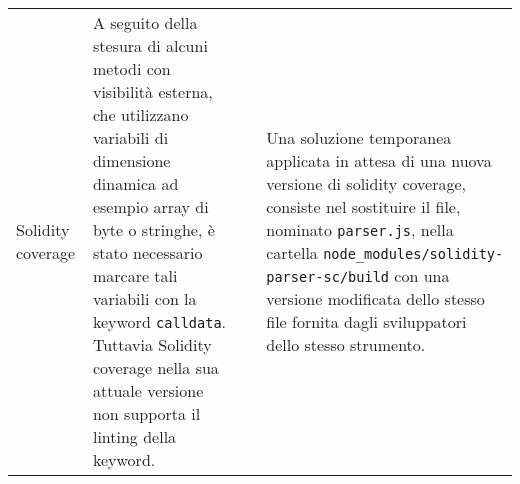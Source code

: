 \begin{longtable}{ >{\centering}p{} >{}p{}
			>{\centering}p{} >{}p{}}
		\tabularnewline 
		Solidity coverage &
		A seguito della stesura di alcuni metodi con visibilità esterna, che utilizzano variabili di dimensione dinamica ad esempio array di byte o stringhe, è stato necessario marcare tali variabili con la keyword \texttt{calldata}. Tuttavia Solidity coverage nella sua attuale versione non supporta il linting della keyword. &
		2 &
		Una soluzione temporanea applicata in attesa di una nuova versione di solidity coverage, consiste nel sostituire il file, nominato \texttt{parser.js}, nella cartella \texttt{node\_modules/solidity-parser\newline-sc/build} con una versione modificata dello stesso file fornita dagli sviluppatori dello stesso strumento.

			
	\end{longtable}
	